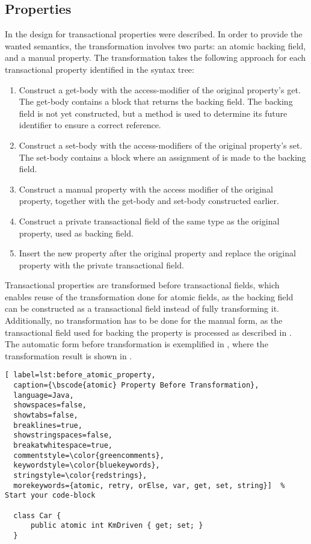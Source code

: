 \subsection{Properties}\label{sec:roslyn_extension_properties}
In  the design for transactional properties were described. In order to provide the wanted semantics, the transformation involves two parts: an atomic backing field, and a manual property. The transformation takes the following approach for each transactional property identified in the syntax tree:

\begin{enumerate}
	\item Construct a get-body with the access-modifier of the original property's get. The get-body contains a block that returns the backing field. The backing field is not yet constructed, but a method is used to determine its future identifier to ensure a correct reference.
	\item Construct a set-body with the access-modifiers of the original property's set. The set-body contains a block where an assignment of  is made to the backing field.
	\item Construct a manual property with the access modifier of the original property, together with the get-body and set-body constructed earlier.
	\item Construct a private transactional field of the same type as the original property, used as backing field.
	\item Insert the new property after the original property and replace the original property with the private transactional field.
\end{enumerate}

Transactional properties are transformed before transactional fields, which enables reuse of the transformation done for atomic fields, as the backing field can be constructed as a transactional field instead of fully transforming it. Additionally, no transformation has to be done for the manual form, as the transactional field used for backing the property is processed as described in . The automatic form before transformation is exemplified in , where the transformation result is shown in .

\begin{lstlisting}[ label=lst:before_atomic_property,
  caption={\bscode{atomic} Property Before Transformation},
  language=Java,  
  showspaces=false,
  showtabs=false,
  breaklines=true,
  showstringspaces=false,
  breakatwhitespace=true,
  commentstyle=\color{greencomments},
  keywordstyle=\color{bluekeywords},
  stringstyle=\color{redstrings},
  morekeywords={atomic, retry, orElse, var, get, set, string}]  % Start your code-block

  class Car {
      public atomic int KmDriven { get; set; }
  }
\end{lstlisting}

